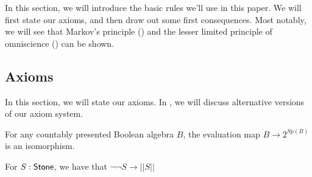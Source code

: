 In this section, we will introduce the basic rules we'll use in this paper. 
We will first state our axioms, and then draw out some first consequences.
Most notably, 
we will see that Markov's principle () and the 
lesser limited principle of omniscience () can be shown. 
\subsection{Axioms}
In this section, we will state our axioms. 
In , we will discuss alternative versions of our axiom system. 
\begin{axiomNum}
  For any countably presented Boolean algebra $B$, the evaluation map $B\rightarrow  2^{Sp(B)}$ is an isomorphism.
\end{axiomNum} 

\begin{axiomNum}
  For $S:\mathsf{Stone}$, we have that $\neg \neg S \to || S ||$
\end{axiomNum}

%

